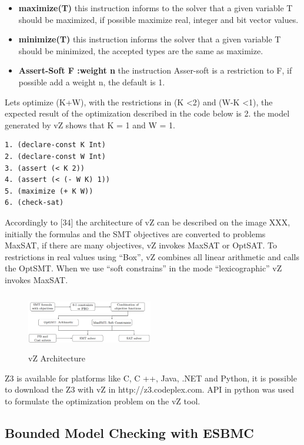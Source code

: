 \begin{itemize}
\item{\textbf{maximize(T)}
this instruction informs to the solver that a given variable T should be maximized, if possible maximize real, integer and bit vector values.}
\item{\textbf{minimize(T)}
this instruction informs the solver that a given variable T should be minimized, the accepted types are the same as maximize.}
\item{\textbf{Assert-Soft F :weight n}
the instruction Asser-soft is a restriction to F, if possible add a weight n, the default is 1.}
\end{itemize}

Lets optimize (K+W), with the restrictions in (K \textless 2) and (W-K \textless 1), the expected result of the optimization described in the code below is 2. the model generated by vZ shows that K = 1 and W = 1.

\begin{lstlisting}[caption=Code "SMT" using vZ, label=vZ]
1. (declare-const K Int) 
2. (declare-const W Int)
3. (assert (< K 2)) 
4. (assert (< (- W K) 1))
5. (maximize (+ K W)) 
6. (check-sat)
\end{lstlisting}


Accordingly to [34] the architecture of vZ can be described on the image XXX, initially the formulas and the SMT objectives are converted to problems MaxSAT, if there are many objectives, vZ invokes MaxSAT or OptSAT. To restrictions in real values using “Box”, vZ combines all linear arithmetic and calls the OptSMT. When we use “soft constrains” in the mode “lexicographic” vZ invokes MaxSAT.
\begin{figure}[ht]
	\centering
  \includegraphics[width=0.49\textwidth, height=95px]{Image/vzArch.png} 
	\caption{vZ Architecture}
	\label{fig2}
\end{figure}

Z3 is available for platforms like C, C ++, Java, .NET and Python, it is possible to download the Z3 with vZ in http://z3.codeplex.com. API in python was used to formulate the optimization problem on the vZ tool. 

\subsection{Bounded Model Checking with ESBMC}

